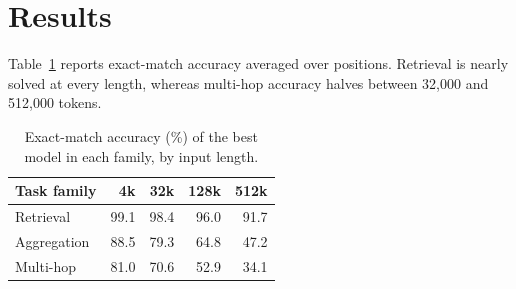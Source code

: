 \section{Results}
\label{sec:results}

Table~\ref{tab:results} reports exact-match accuracy averaged over positions. Retrieval is nearly solved at every length, whereas multi-hop accuracy halves between 32{,}000 and 512{,}000 tokens.

\begin{table}[ht]
  \centering
  \caption{Exact-match accuracy (\%) of the best model in each family, by input length.}
  \label{tab:results}
  \begin{tabular}{lrrrr}
    \toprule
    Task family & 4k & 32k & 128k & 512k \\
    \midrule
    Retrieval & 99.1 & 98.4 & 96.0 & 91.7 \\
    Aggregation & 88.5 & 79.3 & 64.8 & 47.2 \\
    Multi-hop & 81.0 & 70.6 & 52.9 & 34.1 \\
    \bottomrule
  \end{tabular}
\end{table}
